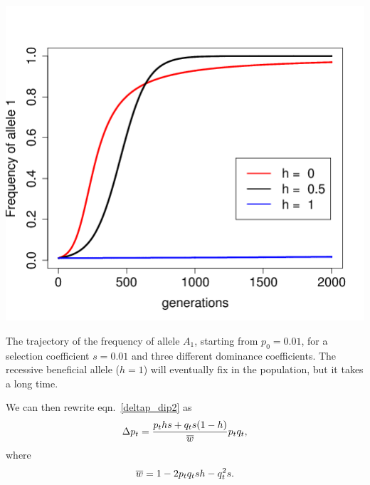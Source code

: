 \begin{marginfigure}
\begin{center}
\includegraphics[width=\textwidth]{figures/simple_diploid_trajs.png}
\end{center}
\caption{The trajectory of the frequency of allele $A_1$, starting
  from $p_{0}=0.01$, for a selection coefficient $s=0.01$ and three
  different dominance coefficients. The recessive beneficial allele ($h=1$) will
  eventually fix in the population, but it takes a long
  time. }
  \label{fig:diploid_traj}
\end{marginfigure}





We can then rewrite eqn.\ \eqref{deltap_dip2} as
\begin{equation}
\Delta p_t = \frac{p_ths + q_t s(1-h)}{\overline{w}}p_tq_t ,
\label{deltap_direct}
\end{equation}
where
\begin{equation}
\overline{w} = 1-2p_tq_t sh-q_t^2s.
\end{equation}\\


